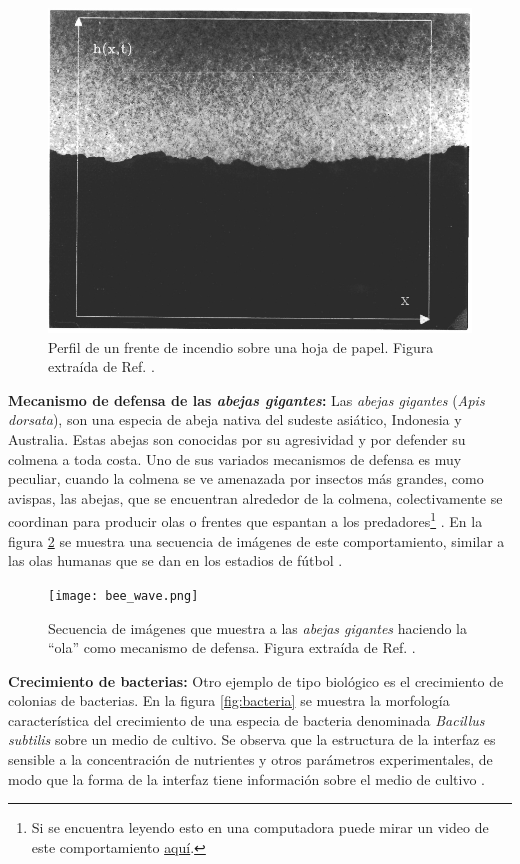 \newpage
\begin{figure}[t]
    \centering
    \includegraphics[width=.6\textwidth]{paper_burned.png}
    \caption[Perfil de un frente de incendio sobre una hoja de papel]{Perfil de un frente de incendio sobre una hoja de papel. Figura extraída de Ref. \cite{zhang1992modeling}.}
    \label{fig:incendio}
\end{figure}


\textbf{Mecanismo de defensa de las \textit{abejas gigantes}:} Las \textit{abejas gigantes} (\textit{Apis dorsata}), son una especia de abeja nativa del sudeste asiático, 
Indonesia y Australia. Estas abejas son conocidas por su agresividad y por defender su colmena a toda costa. Uno de sus variados mecanismos de defensa es muy peculiar,
cuando la colmena se ve amenazada por insectos más grandes, como avispas, las abejas, que se encuentran alrededor de la colmena, colectivamente se coordinan para 
producir olas o frentes que espantan a los predadores\footnote{Si se encuentra leyendo esto en una computadora puede mirar un video de este comportamiento 
\href{https://youtu.be/8bNKU8GRYmU}{aquí}.} \cite{kastberger2014speeding,kastberger2013social,kastberger2008social}. En la figura \ref{fig:abeja} se muestra una secuencia de imágenes de este comportamiento, similar a las olas humanas que se dan en los estadios de fútbol \cite{farkas2002mexican,farkas2003human}.

\begin{figure}[!b]
    \centering
    \texttt{[image: bee\_wave.png]}
    \caption[Mecanismo de defensa de las \textit{abejas gigantes}.]{Secuencia de imágenes que muestra a las \textit{abejas gigantes} haciendo la ``ola'' como mecanismo de defensa. Figura extraída de Ref. \cite{youtube}.}
    \label{fig:abeja}
\end{figure}

\textbf{Crecimiento de bacterias:} Otro ejemplo de tipo biológico es el crecimiento de colonias de bacterias. En la figura 
\ref{fig:bacteria} se muestra la morfología característica del crecimiento de una especia de bacteria denominada \textit{Bacillus subtilis} sobre un medio de cultivo. 
Se observa que la estructura de la interfaz es sensible a la concentración de nutrientes y otros parámetros experimentales, de modo que la forma de la interfaz tiene 
información sobre el medio de cultivo \cite{matsushita1990diffusion,bhattacharjee2022chemotactic}.


